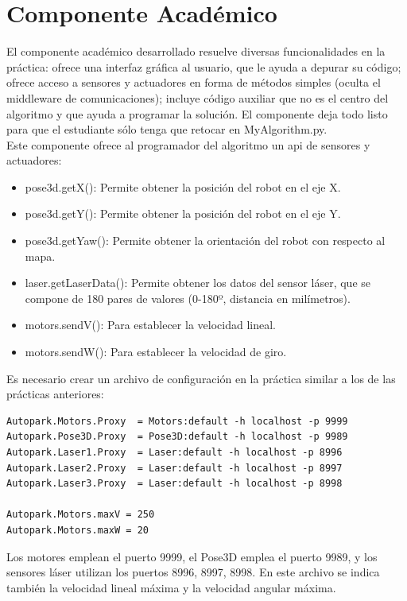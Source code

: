 \section{Componente Académico}
El componente académico desarrollado resuelve diversas funcionalidades en la práctica: ofrece una interfaz gráfica al usuario, que le ayuda a depurar su código; ofrece acceso a sensores y actuadores en forma de métodos simples (oculta el middleware de comunicaciones); incluye código auxiliar que no es el centro del algoritmo y que ayuda a programar la solución. El componente deja todo listo para que el estudiante sólo tenga que retocar en MyAlgorithm.py.\\

Este componente ofrece al programador del algoritmo un \acrshort{api} de sensores y actuadores:

\begin{itemize}
\item pose3d.getX(): Permite obtener la posición del robot en el eje X.
\item	pose3d.getY(): Permite obtener la posición del robot en el eje Y.
\item	pose3d.getYaw(): Permite obtener la orientación del robot con respecto al mapa.
\item	laser.getLaserData(): Permite obtener los datos del sensor láser, que se compone de 180 pares de valores (0-180º, distancia en milímetros).
\item motors.sendV(): Para establecer la velocidad lineal.
\item	motors.sendW(): Para establecer la velocidad de giro.
\end{itemize}

Es necesario crear un archivo de configuración en la práctica similar a los de las prácticas anteriores:

\vspace{20pt}
	\begin{lstlisting}[frame=single]
Autopark.Motors.Proxy  = Motors:default -h localhost -p 9999
Autopark.Pose3D.Proxy  = Pose3D:default -h localhost -p 9989
Autopark.Laser1.Proxy  = Laser:default -h localhost -p 8996
Autopark.Laser2.Proxy  = Laser:default -h localhost -p 8997
Autopark.Laser3.Proxy  = Laser:default -h localhost -p 8998

Autopark.Motors.maxV = 250
Autopark.Motors.maxW = 20

	\end{lstlisting}


Los motores emplean el puerto 9999, el Pose3D emplea el puerto 9989, y los sensores láser utilizan los puertos 8996, 8997, 8998. En este archivo se indica también la velocidad lineal máxima y la velocidad angular máxima.\\

